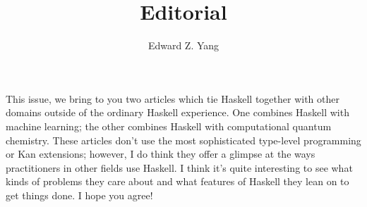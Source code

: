 \documentclass{tmr}
\title{Editorial}
\author{Edward Z. Yang\email{ezyang@cs.stanford.edu}}
\begin{document}
This issue, we bring to you two articles which tie Haskell together with
other domains outside of the ordinary Haskell experience.  One combines
Haskell with machine learning; the other combines Haskell with computational
quantum chemistry.  These articles don't use the most sophisticated
type-level programming or Kan extensions; however, I do think they offer
a glimpse at the ways practitioners in other fields use Haskell.  I think
it's quite interesting to see what kinds of problems they care about
and what features of Haskell they lean on to get things done.  I hope you
agree!
\end{document}
